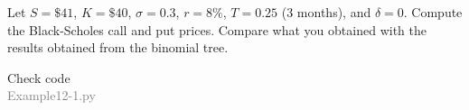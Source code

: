 \begin{frame}[fragile,t]
\begin{myexample}
	Let $S=\$41$,	$K=\$40$,  $\sigma=0.3$, $r=8\%$,  $T=0.25$ (3 months), and $\delta=0$. Compute the
	Black-Scholes call and put prices. Compare what you obtained with the results obtained from the
	binomial tree.
\end{myexample}
\vfill
\begin{center}
	Check code \\
	\textcolor{gray}{Example12-1.py}
\end{center}
\end{frame}
%
%
